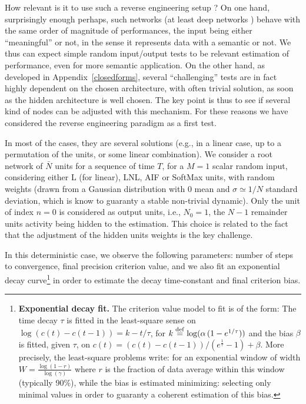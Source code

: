 How relevant is it to use such a reverse engineering setup ? On one hand, surprisingly enough perhaps, such networks (at least deep networks \cite{Zhang2016Understanding}) behave with the same order of magnitude of performances, the input being either ``meaningful'' or not, in the sense it represents data with a semantic or not. We thus can expect simple random input/output tests to be relevant estimation of performance, even for more semantic application. On the other hand, as developed in Appendix~\ref{closedforms}, several ``challenging'' tests are in fact highly dependent on the chosen architecture, with often trivial solution, as soon as the hidden architecture is well chosen. The key point is thus to see if several kind of nodes can be adjusted with this mechanism. For these reasons we have considered the reverse engineering paradigm as a first test.

In most of the cases, they are several solutions (e.g.,  in a linear case, up to a permutation of the units, or some linear combination). We consider a root network of $\bar{N}$ units for a sequence of time $T$, for a $M=1$ scalar random input, considering either L (for linear), LNL, AIF or SoftMax units, with random weights (drawn from a Gaussian distribution with $0$ mean and $\sigma \simeq 1/N$ standard deviation, which is know to guaranty a stable non-trivial dynamic). Only the unit of index $n=0$ is considered as output units, i.e., $N_0 = 1$, the $N-1$ remainder units activity being hidden to the estimation. This choice is related to the fact that the adjustment of the hidden units weights is the key challenge.

In this deterministic case, we observe the following parameters: number of steps to convergence, final precision criterion value, and we also fit an exponential decay curve\footnote{{\bf Exponential decay fit.} The criterion value model to fit is of the form: 
The time decay $\tau$ is fitted in the least-square sense on $\log(c(t) - c(t-1)) = k - t / \tau$, for $k\stackrel {\rm def}{=} \log(\alpha\,(1-e^{1/\tau}))$ and the bias $\beta$ is fitted, given $\tau$, on $c(t) = (c(t) - c(t-1))/(e^\frac{1}{\tau}-1) + \beta$. More precisely, the least-square problems write: 
for an exponential window of width $W=\frac{\log(1 - r)}{\log(\gamma)}$ where $r$ is the fraction of data average within this window (typically 90\%), while the bias is estimated minimizing:  
selecting only minimal values in order to guaranty a coherent estimation of this bias.} in order to estimate the decay time-constant and final criterion bias.

